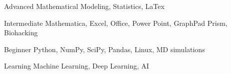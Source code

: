 


\begin{cvskills}


\cvskill
{Advanced} %
{Mathematical Modeling, Statistics, LaTex} %


\cvskill
{Intermediate} %
{Mathematica, Excel, Office, Power Point, GraphPad Prism, Biohacking} %


\cvskill
{Beginner} %
{Python, NumPy, SciPy, Pandas, Linux, MD simulations} %


\cvskill
{Learning} %
{Machine Learning, Deep Learning, AI} %



\end{cvskills}